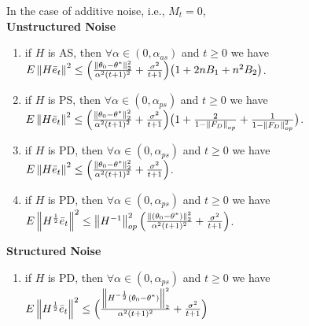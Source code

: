 \begin{theorem}
In the case of additive noise, i.e., $M_t=0$, \\
\textbf{Unstructured Noise}
\begin{enumerate}[label=(\roman*)]
\item if $H$ is AS, then $\forall \alpha\in (0,\alpha_{as})$ and $t\geq0 $ we have $E\left\| H\bar{e}_t\right\|^2\leq \Big(\frac{\left\| \theta_0-\theta^*\right\|^2_2}{\alpha^2(t+1)^2}+\frac{\sigma^2}{t+1}\Big)\big(1+2nB_1+n^2B_2\big)$.
\item if $H$ is PS, then $\forall \alpha \in (0,\alpha_{ps})$ and $t\geq 0$ we have $E\left\| H\bar{e}_t\right\|^2\leq \Big(\frac{\left\| \theta_0-\theta^*\right\|^2_2}{\alpha^2(t+1)^2}+\frac{\sigma^2}{t+1}\Big)\big(1+\frac{2}{1-\left\| F_D\right\|_{op}}+\frac{1}{1-\left\| F_D\right\|^2_{op}}\big)$.
\item if $H$ is PD, then $\forall \alpha \in (0,\alpha_{ps})$ and $t\geq 0$ we have $E\left\| H\bar{e}_t\right\|^2\leq \Big(\frac{\left\| \theta_0-\theta^*\right\|^2_2}{\alpha^2(t+1)^2}+\frac{\sigma^2}{t+1}\Big)$.
\item if $H$ is PD, then $\forall \alpha \in (0,\alpha_{ps})$ and $t\geq 0$ we have $E\left\| H^{\frac{1}{2}}\bar{e}_t\right\|^2\leq \left\| H^{-1}\right\|^2_{op}\Big(\frac{\left\| (\theta_0-\theta^*)\right\|^2_2}{\alpha^2(t+1)^2}+\frac{\sigma^2}{t+1}\Big)$.
\end{enumerate}
\textbf{Structured Noise}
\begin{enumerate}[label=(\roman*)]
\item if $H$ is PD, then $\forall \alpha \in (0,\alpha_{ps})$ and $t\geq 0$ we have $E\left\| H^{\frac{1}{2}}\bar{e}_t\right\|^2\leq \Big(\frac{\left\| H^{-\frac{1}{2}}(\theta_0-\theta^*)\right\|^2_2}{\alpha^2(t+1)^2}+\frac{\sigma^2}{t+1}\Big)$
\end{enumerate}
\end{theorem}


